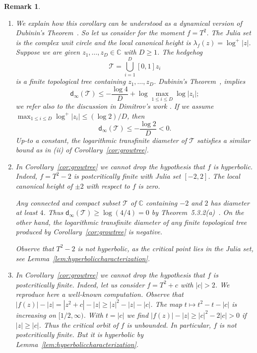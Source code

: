 \documentclass[12pt,oneside,a4]{amsart}
\newcommand{\IC}{\mathbb{C}}
\newcommand{\cT}{\mathcal{T}}
\newcounter{maincounter}
\numberwithin{maincounter}{section}
\numberwithin{equation}{section}
\newtheorem{remark}[maincounter]{Remark}
\begin{document}
\begin{remark}
  \begin{enumerate}
  \item [(i)]
    We explain how this corollary can be understood as a dynamical
    version of Dubinin's Theorem~\cite{Dubinin}.
    So let us consider for the moment $f=T^2$. The Julia set is the
    complex unit circle and the local canonical height is $\lambda_f(z) =
    \log^+|z|$. Suppose we are given $z_1,\ldots,z_D\in\IC$ with $D\ge 1$.
    The hedgehog
    \begin{equation*}
      \cT = \bigcup_{i=1}^D [0,1]z_i
    \end{equation*}
    is a finite topological tree containing $z_1,\ldots,z_D$.
    Dubinin's Theorem~\cite{Dubinin}, implies    
    \begin{equation*}
      \mathsf{d}_\infty(\cT) \le -\frac{\log 4}{D}+\log\max_{1\le i\le
        D}\log|z_i|;
    \end{equation*}
    we refer also to the discussion in Dimitrov's work \cite{dimitrov:SZ}.
    If we assume $\max_{1\le i\le D}\log^+|z_i| \le (\log 2)/D$,
    then
    \begin{equation*}
      \mathsf{d}_\infty(\cT)\le -\frac{\log 2}{D} <0.
    \end{equation*}
    Up-to a constant, the logarithmic transfinite diameter of $\cT$ satisfies a
    similar bound as in (ii) of Corollary~\ref{cor:growtree}.

    \item[(ii)] In Corollary~\ref{cor:growtree} we cannot drop the
      hypothesis that $f$ is hyperbolic. Indeed, $f=T^2-2$ is
      postcritically finite with Julia set $[-2,2]$. The local canonical height of
      $\pm 2$ with respect to $f$ is zero.      

      Any connected and compact subset $\cT$ of $\IC$ containing $-2$ and
      $2$ has diameter at least $4$. Thus $\mathsf{d}_\infty(\cT)\ge \log(4/4)=0$ by
      Theorem~5.3.2(a)~\cite{Ransford}.  On the other hand,
      the logarithmic
      transfinite diameter of any finite topological tree produced by
      Corollary~\ref{cor:growtree}
      is negative.

      Observe that   $T^2-2$ is not hyperbolic, as the critical point lies in
      the Julia set, see
      Lemma~\ref{lem:hyperboliccharacterization}.
    \item[(iii)] In Corollary~\ref{cor:growtree} we cannot drop the
      hypothesis that $f$ is postcritically finite. Indeed, let us
      consider $f=T^2+c$ with $|c|>2$. We reproduce here a well-known
      computation. Observe that $|f(z)|-|z|=|z^2+c|-|z|\ge
      |z|^2-|z|-|c|$. The map $t\mapsto t^2-t-|c|$ is increasing on
      $[1/2,\infty)$. With $t=|c|$ we find  $|f(z)|-|z|\ge
      |c|^2-2|c|>0$ if $|z|\ge |c|$. Thus the critical orbit of $f$ is
      unbounded. In particular, $f$ is not postcritically finite. But it is
      hyperbolic by Lemma~\ref{lem:hyperboliccharacterization}.


\end{enumerate}
\end{remark}
\end{document}
